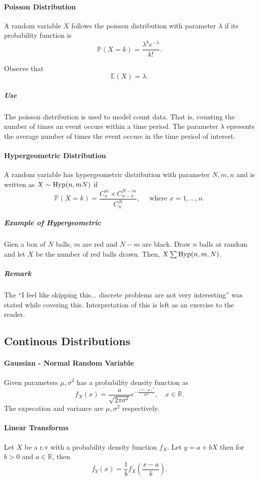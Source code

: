 \paragraph{Poisson Distribution}
A random variable \(X\) follows the poisson distribution
with parameter \(\lambda\) if its probability function is
\[
    \mathbb{P}(X = k)
    = \frac{\lambda^k e^{-\lambda}}{k!}.
\]

Observe that
\[
    \mathbb{E}(X) = \lambda.
\]

\subparagraph{Use} The poisson distribution is used to model
count data. That is, counting the number of times
an event occurs within a time period.
The parameter \(\lambda\) epresents the average number of times
the event occurs in the time period of interest.



\paragraph{Hypergeometric Distribution}
A random variable has hypergeometric distribution with
parameter \(N, m, n\) and is written as
\(X\sim \mathrm{Hyp}(n,m N)\) if
\[
    \mathbb{P}(X = k)
    =
    \frac{C_x^m \times C^{N-m}_{n-x}}{C^N_n},
    \quad
    \text{ where } x = 1,\dots, n.
\]
\subparagraph{Example of Hypergeometric}
Gien a box of \(N\) balls, \(m\) are red and
\(N - m\) are black. Draw \(n\) balls at random and let
\(X\) be the number of red balls drawn. Then, \(X\sum \mathrm{Hyp}(n, m, N)\).

\subparagraph{Remark}
The ``I feel like skipping this... discrete problems are not very interesting''
was stated while covering this. Interpretation of this
is left as an exercise to the reader.


\subsection{Continous Distributions}

\paragraph{Gaussian - Normal Random Variable}
Given parameters \(\mu, \sigma^2\) has a probability density
function as
\[
    f_X(x)
    =
    \dfrac{a}{\sqrt{2\pi\sigma^2}}
    e^{-\frac{(x-\mu)^2}{2\sigma^2}},
    \quad
    x\in \mathbb{R}.
\]
The expecation and variance are \(\mu, \sigma^2\)
respectively.

\paragraph{Linear Transforms}
Let \(X\) be a r.v with a probability
density function \(f_X\). Let
\(y = a + bX\) then for \(b > 0\) and \(a\in\mathbb{R}\),
then \[
    f_Y(x) = \frac{1}{b}f_X \left(
        \frac{x-a}{b}
    \right).
\]

